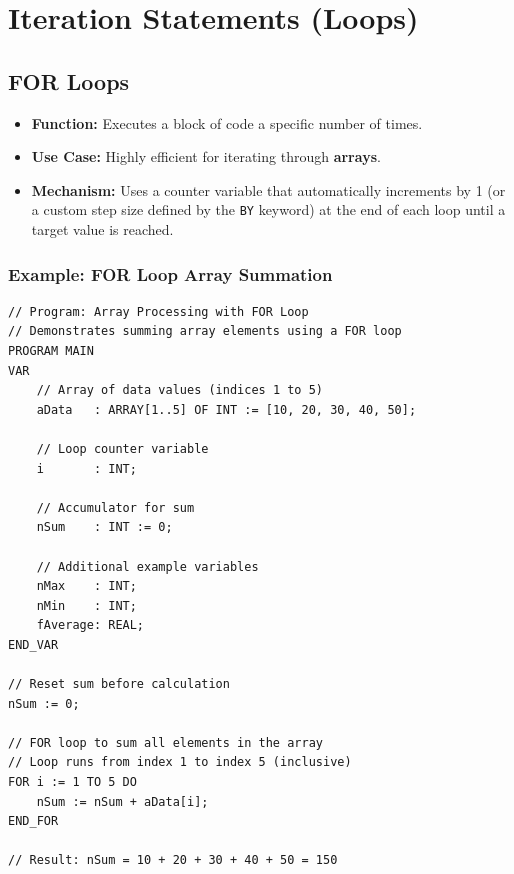 \documentclass[11pt,a4paper]{article}
\begin{document}
\section{Iteration Statements (Loops)}

\subsection{FOR Loops}

\begin{itemize}[leftmargin=*]
    \item \textbf{Function:} Executes a block of code a specific number of times.
    
    \item \textbf{Use Case:} Highly efficient for iterating through \textbf{arrays}.
    
    \item \textbf{Mechanism:} Uses a counter variable that automatically increments by 1 (or a custom step size defined by the \texttt{BY} keyword) at the end of each loop until a target value is reached.
\end{itemize}

\subsubsection*{Example: FOR Loop Array Summation}

\begin{lstlisting}
// Program: Array Processing with FOR Loop
// Demonstrates summing array elements using a FOR loop
PROGRAM MAIN
VAR
    // Array of data values (indices 1 to 5)
    aData   : ARRAY[1..5] OF INT := [10, 20, 30, 40, 50];
    
    // Loop counter variable
    i       : INT;
    
    // Accumulator for sum
    nSum    : INT := 0;
    
    // Additional example variables
    nMax    : INT;
    nMin    : INT;
    fAverage: REAL;
END_VAR

// Reset sum before calculation
nSum := 0;

// FOR loop to sum all elements in the array
// Loop runs from index 1 to index 5 (inclusive)
FOR i := 1 TO 5 DO
    nSum := nSum + aData[i];
END_FOR

// Result: nSum = 10 + 20 + 30 + 40 + 50 = 150
\end{lstlisting}
\end{document}

